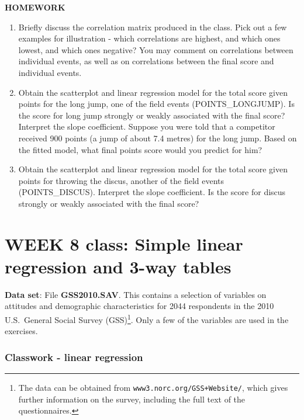 \textbf{HOMEWORK}

\begin{enumerate}

\item
Briefly discuss the correlation matrix produced in the class. Pick out a few
examples for illustration - which correlations are highest, and which ones lowest,
and which ones negative? You may comment on correlations between individual events, as
well as on correlations between the final score and individual events.
\item
Obtain the scatterplot and linear regression model for
the total score given points for the long jump, one of the
field events (POINTS\_LONGJUMP). Is the
score for long jump strongly or weakly associated with the final score?
Interpret the slope coefficient. Suppose you were told that a competitor received
900 points (a jump of about 7.4 metres) for the long jump.
Based on the fitted model, what final points score would you predict for
him?
\item
Obtain the scatterplot and linear regression model for
the total score given points for throwing the discus, another of the
field events (POINTS\_DISCUS). Interpret the slope coefficient. Is the
score for discus strongly or weakly associated with the final score?
\end{enumerate}


\newpage

\section[Week 9: Simple linear regression 2]{WEEK 8 class: Simple linear
regression and 3-way tables}

\textbf{Data set}: File \textbf{GSS2010.SAV}. This contains a
selection of variables on attitudes and demographic characteristics for
2044 respondents in the 2010 U.S.\ General Social Survey
(GSS)\footnote{The data can be obtained from
\texttt{www3.norc.org/GSS+Website/}, which gives further information on
the survey, including the full text of the questionnaires. }. Only a few
of the variables are used in the exercises.

\subsubsection{Classwork - linear regression}

